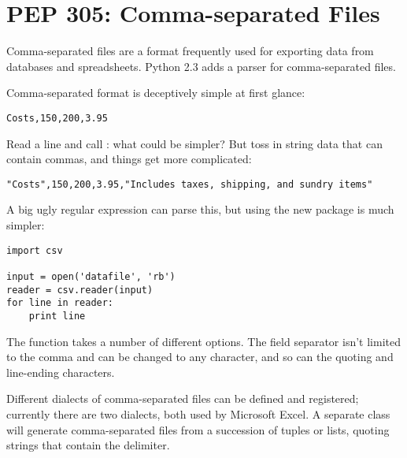 \documentclass{howto}
\begin{document}
\section{PEP 305: Comma-separated Files \label{section-pep305}}

Comma-separated files are a format frequently used for exporting data
from databases and spreadsheets.  Python 2.3 adds a parser for
comma-separated files.

Comma-separated format is deceptively simple at first glance:

\begin{verbatim}
Costs,150,200,3.95
\end{verbatim}

Read a line and call : what could be simpler?
But toss in string data that can contain commas, and things get more
complicated:

\begin{verbatim}
"Costs",150,200,3.95,"Includes taxes, shipping, and sundry items"
\end{verbatim}

A big ugly regular expression can parse this, but using the new 
 package is much simpler:

\begin{verbatim}
import csv

input = open('datafile', 'rb')
reader = csv.reader(input)
for line in reader:
    print line
\end{verbatim}

The  function takes a number of different options.
The field separator isn't limited to the comma and can be changed to
any character, and so can the quoting and line-ending characters.

Different dialects of comma-separated files can be defined and
registered; currently there are two dialects, both used by Microsoft Excel.
A separate  class will generate comma-separated files
from a succession of tuples or lists, quoting strings that contain the
delimiter.  

\begin{seealso}


\end{seealso}
\end{document}
